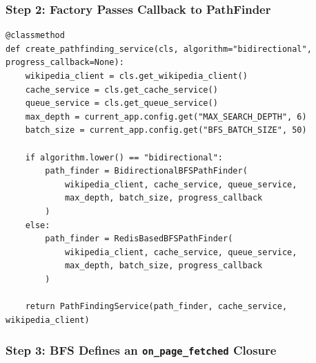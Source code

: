 \documentclass[11pt,a4paper]{article}
\begin{document}
\subsubsection{Step 2: Factory Passes Callback to PathFinder}

\begin{lstlisting}[caption=factory.py -- Injecting the Callback]
@classmethod
def create_pathfinding_service(cls, algorithm="bidirectional", progress_callback=None):
    wikipedia_client = cls.get_wikipedia_client()
    cache_service = cls.get_cache_service()
    queue_service = cls.get_queue_service()
    max_depth = current_app.config.get("MAX_SEARCH_DEPTH", 6)
    batch_size = current_app.config.get("BFS_BATCH_SIZE", 50)

    if algorithm.lower() == "bidirectional":
        path_finder = BidirectionalBFSPathFinder(
            wikipedia_client, cache_service, queue_service,
            max_depth, batch_size, progress_callback
        )
    else:
        path_finder = RedisBasedBFSPathFinder(
            wikipedia_client, cache_service, queue_service,
            max_depth, batch_size, progress_callback
        )

    return PathFindingService(path_finder, cache_service, wikipedia_client)
\end{lstlisting}

\subsubsection{Step 3: BFS Defines an \texttt{on\_page\_fetched} Closure}
\end{document}
